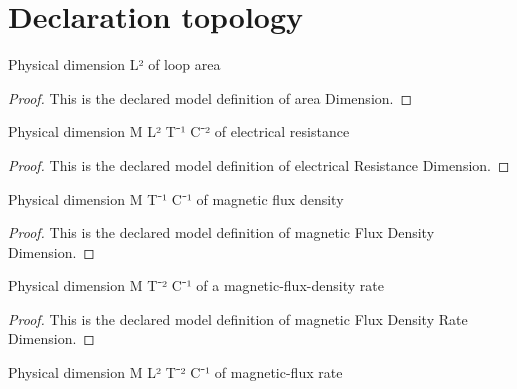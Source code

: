 \section{Declaration topology}
\begin{definition}
  \label{def:physics:phyx-mini-0917:phyxminiproblems-problemphyxmini0917-areadimension}
  Physical dimension L² of loop area
\end{definition}
\begin{proof}
  This is the declared model definition of area Dimension.
\end{proof}
\begin{definition}
  \label{def:physics:phyx-mini-0917:phyxminiproblems-problemphyxmini0917-electricalresistancedimension}
  Physical dimension M L² T⁻¹ C⁻² of electrical resistance
\end{definition}
\begin{proof}
  This is the declared model definition of electrical Resistance Dimension.
\end{proof}
\begin{definition}
  \label{def:physics:phyx-mini-0917:phyxminiproblems-problemphyxmini0917-magneticfluxdensitydimension}
  Physical dimension M T⁻¹ C⁻¹ of magnetic flux density
\end{definition}
\begin{proof}
  This is the declared model definition of magnetic Flux Density Dimension.
\end{proof}
\begin{definition}
  \label{def:physics:phyx-mini-0917:phyxminiproblems-problemphyxmini0917-magneticfluxdensityratedimension}
  Physical dimension M T⁻² C⁻¹ of a magnetic-flux-density rate
\end{definition}
\begin{proof}
  This is the declared model definition of magnetic Flux Density Rate Dimension.
\end{proof}
\begin{definition}
  \label{def:physics:phyx-mini-0917:phyxminiproblems-problemphyxmini0917-magneticfluxratedimension}
  Physical dimension M L² T⁻² C⁻¹ of magnetic-flux rate
\end{definition}
